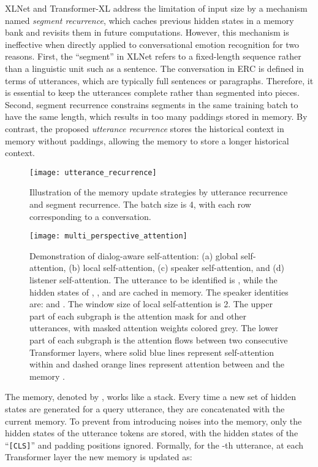\documentclass[letterpaper]{article} \usepackage{aaai21}  \usepackage{times}  \usepackage{helvet} \usepackage{courier}  \usepackage[hyphens]{url}  \usepackage{graphicx} \usepackage{amstext}
\begin{document}
XLNet \cite{yang2019xlnet} and Transformer-XL \cite{dai2019transformer} address the limitation of input size by a mechanism named \emph{segment recurrence}, which caches previous hidden states in a memory bank and revisits them in future computations. However, this mechanism is ineffective when directly applied to conversational emotion recognition for two reasons. First, the ``segment'' in XLNet refers to a fixed-length sequence rather than a linguistic unit such as a sentence. The conversation in ERC is defined in terms of utterances, which are typically full sentences or paragraphs. Therefore, it is essential to keep the utterances complete rather than segmented into pieces. Second, segment recurrence constrains segments in the same training batch to have the same length, which results in too many paddings stored in memory. By contrast, the proposed \emph{utterance recurrence} stores the historical context in memory without paddings, allowing the memory to store a longer historical context. 

\begin{figure}[t]
	\centering
	\texttt{[image: utterance\_recurrence]} \caption{Illustration of the memory update strategies by utterance recurrence and segment recurrence. The batch size is 4, with each row corresponding to a conversation.}
	\label{fig:utterance_recurrence}
\end{figure}

\begin{figure*}[t]
	\centering
	\texttt{[image: multi\_perspective\_attention]} \caption{Demonstration of dialog-aware self-attention: (a) global self-attention, (b) local self-attention, (c) speaker self-attention, and (d) listener self-attention. The utterance to be identified is , while the hidden states of , , and  are cached in memory. The speaker identities are:  and . The window size of local self-attention is 2. The upper part of each subgraph is the attention mask for  and other utterances, with masked attention weights colored grey. The lower part of each subgraph is the attention flows between two consecutive Transformer layers, where solid blue lines represent self-attention within  and dashed orange lines represent attention between  and the memory .}
	\label{fig:multi_perspective_attention}
\end{figure*} 

The memory, denoted by , works like a stack. Every time a new set of hidden states are generated for a query utterance, they are concatenated with the current memory. To prevent from introducing noises into the memory, only the hidden states of the utterance tokens are stored, with the hidden states of the ``\texttt{[CLS]}'' and padding positions ignored. Formally, for the -th utterance, at each Transformer layer  the new memory  is updated as:
 
\end{document}
